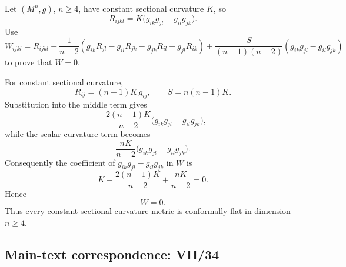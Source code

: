 \begin{problem}
\label{prob:cp-vii-0078}
Let \((M^n,g)\), \(n\ge4\), have constant sectional curvature \(K\), so
\[
R_{ijkl}
=
K\bigl(g_{ik}g_{jl}-g_{il}g_{jk}\bigr).
\]
Use
\[
W_{ijkl}
=
R_{ijkl}
-\frac1{n-2}
\left(
g_{ik}R_{jl}-g_{il}R_{jk}
-g_{jk}R_{il}+g_{jl}R_{ik}
\right)
+\frac{S}{(n-1)(n-2)}
\left(
g_{ik}g_{jl}-g_{il}g_{jk}
\right)
\]
to prove that \(W=0\).
\end{problem}

\begin{solution}
For constant sectional curvature,
\[
R_{ij}=(n-1)K\,g_{ij},
\qquad
S=n(n-1)K.
\]
Substitution into the middle term gives
\[
-\frac{2(n-1)K}{n-2}
\bigl(g_{ik}g_{jl}-g_{il}g_{jk}\bigr),
\]
while the scalar-curvature term becomes
\[
\frac{nK}{n-2}
\bigl(g_{ik}g_{jl}-g_{il}g_{jk}\bigr).
\]
Consequently the coefficient of
\(g_{ik}g_{jl}-g_{il}g_{jk}\) in \(W\) is
\[
K-\frac{2(n-1)K}{n-2}+\frac{nK}{n-2}=0.
\]
Hence
\[
\boxed{W=0}.
\]
Thus every constant-sectional-curvature metric is conformally flat in
dimension \(n\ge4\).
\end{solution}

\subsection*{Main-text correspondence: VII/34}


